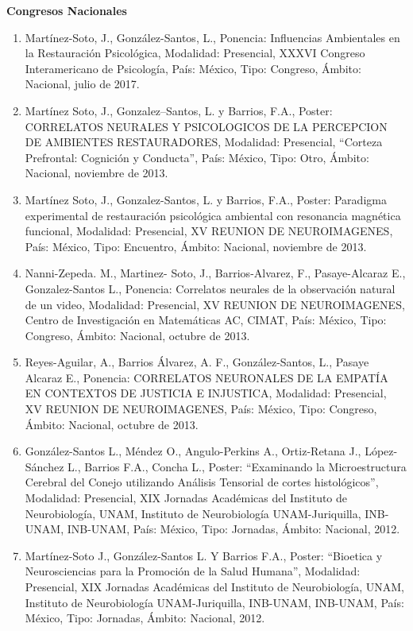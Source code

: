 \textbf{Congresos Nacionales}

\hfill

\begin{enumerate}

\item Martínez-Soto, J., González-Santos, L., Ponencia: Influencias Ambientales en la Restauración Psicológica, Modalidad: 
Presencial, XXXVI Congreso Interamericano de Psicología, País: México, Tipo: Congreso, Ámbito: Nacional, julio de 2017.


\item Martínez Soto, J., Gonzalez--Santos, L. y Barrios, F.A., Poster: CORRELATOS NEURALES Y PSICOLOGICOS DE 
LA PERCEPCION DE AMBIENTES RESTAURADORES, Modalidad: Presencial, “Corteza Prefrontal: Cognición y Conducta”, País: México, 
Tipo: Otro, Ámbito: Nacional, noviembre de 2013.

\item Martínez Soto, J., Gonzalez-Santos, L. y Barrios, F.A., Poster: Paradigma experimental de restauración psicológica 
ambiental con resonancia magnética funcional, Modalidad: Presencial, XV REUNION DE NEUROIMAGENES, País: México, Tipo: 
Encuentro, Ámbito: Nacional, noviembre de 2013.

\item Nanni-Zepeda. M., Martinez- Soto, J., Barrios-Alvarez, F., Pasaye-Alcaraz E., Gonzalez-Santos L., Ponencia: Correlatos 
neurales de la observación natural de un video, Modalidad: Presencial, XV REUNION DE NEUROIMAGENES, Centro de Investigación 
en Matemáticas AC, CIMAT, País: México, Tipo: Congreso, Ámbito: Nacional, octubre de 2013.

\item Reyes-Aguilar, A., Barrios Álvarez, A. F., González-Santos, L., Pasaye Alcaraz E., Ponencia: CORRELATOS NEURONALES DE LA 
EMPATÍA EN CONTEXTOS DE JUSTICIA E INJUSTICA, Modalidad: Presencial, XV REUNION DE NEUROIMAGENES, País: México, Tipo: 
Congreso, Ámbito: Nacional, octubre de 2013.

\item González-Santos L., Méndez O., Angulo-Perkins A., Ortiz-Retana J., López-Sánchez L., Barrios F.A., Concha L., Poster: 
“Examinando la Microestructura Cerebral del Conejo utilizando Análisis Tensorial de cortes histológicos”, Modalidad: 
Presencial, XIX Jornadas Académicas del Instituto de Neurobiología, UNAM, Instituto de Neurobiología UNAM-Juriquilla, 
INB-UNAM, INB-UNAM, País: México, Tipo: Jornadas, Ámbito: Nacional, 2012.

\item Martínez-Soto J., González-Santos L. Y Barrios F.A., Poster: “Bioetica y Neurosciencias para la Promoción de la Salud 
Humana”, Modalidad: Presencial, XIX Jornadas Académicas del Instituto de Neurobiología, UNAM, Instituto de Neurobiología 
UNAM-Juriquilla, INB-UNAM, INB-UNAM, País: México, Tipo: Jornadas, Ámbito: Nacional, 2012.


\end{enumerate}

